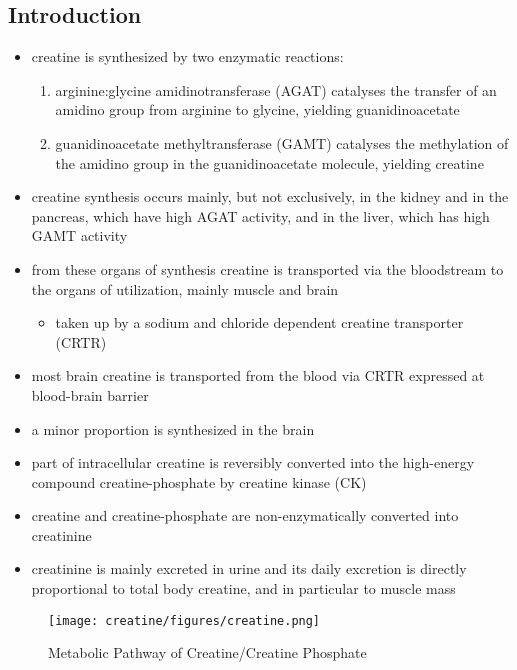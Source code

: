 \documentclass[12pt]{scrartcl}
\begin{document}
\subsection{Introduction}
\label{sec:orgb1669e2}
\begin{itemize}
\item creatine is synthesized by two enzymatic reactions:
\begin{enumerate}
\item arginine:glycine amidinotransferase (AGAT) catalyses the
transfer of an amidino group from arginine to glycine, yielding
guanidinoacetate
\item guanidinoacetate methyltransferase (GAMT) catalyses the
methylation of the amidino group in the guanidinoacetate
molecule, yielding creatine
\end{enumerate}

\item creatine synthesis occurs mainly, but not exclusively, in the kidney
and in the pancreas, which have high AGAT activity, and in the
liver, which has high GAMT activity

\item from these organs of synthesis creatine is transported via the
bloodstream to the organs of utilization, mainly muscle and brain
\begin{itemize}
\item taken up by a sodium and chloride dependent creatine transporter
(CRTR)
\end{itemize}

\item most brain creatine is transported from the blood via CRTR expressed
at blood-brain barrier
\item a minor proportion is synthesized in the brain

\item part of intracellular creatine is reversibly converted into the
high-energy compound creatine-phosphate by creatine kinase (CK)

\item creatine and creatine-phosphate are non-enzymatically converted into
creatinine

\item creatinine is mainly excreted in urine and its daily excretion is
directly proportional to total body creatine, and in particular to
muscle mass
\end{itemize}

\begin{figure}[htbp]
\centering
\texttt{[image: creatine/figures/creatine.png]}
\caption{\label{fig:org8af5f54}Metabolic Pathway of Creatine/Creatine Phosphate}
\end{figure}
\end{document}

